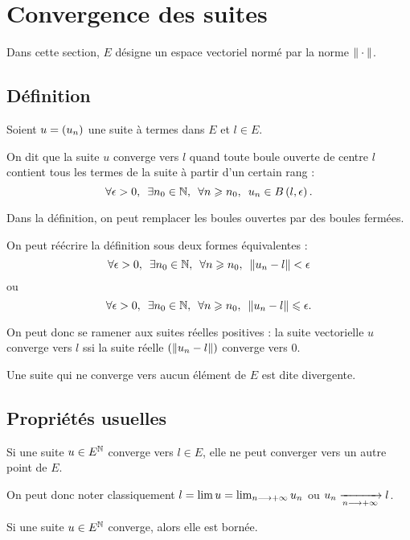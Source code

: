 \section{Convergence des suites}

Dans cette section, \(E\) désigne un espace vectoriel normé par la norme \(\norme{}\).

\subsection{Définition}

\begin{defi}
Soient \(u=\left(u_n\right)\) une suite à termes dans \(E\) et \(l\in E\).

On dit que la suite \(u\) converge vers \(l\) quand toute boule ouverte de centre \(l\) contient tous les termes de la suite à partir d'un certain rang : \[\quantifs{\forall\epsilon>0;\exists n_0\in\N;\forall n\geq n_0}u_n\in\bouleo{l}{\epsilon}.\]
\end{defi}

\begin{prop}
Dans la définition, on peut remplacer les boules ouvertes par des boules fermées.

On peut réécrire la définition sous deux formes équivalentes : \[\quantifs{\forall\epsilon>0;\exists n_0\in\N;\forall n\geq n_0}\norme{u_n-l}<\epsilon\] ou \[\quantifs{\forall\epsilon>0;\exists n_0\in\N;\forall n\geq n_0}\norme{u_n-l}\leq\epsilon.\]

On peut donc se ramener aux suites réelles positives : la suite vectorielle \(u\) converge vers \(l\) ssi la suite réelle \(\paren{\norme{u_n-l}}\) converge vers \(0\).
\end{prop}

Une suite qui ne converge vers aucun élément de \(E\) est dite divergente.

\subsection{Propriétés usuelles}

\begin{prop}
Si une suite \(u\in E^{\mathbb{N}}\) converge vers \(l\in E\), elle ne peut converger vers un autre point de \(E\).

On peut donc noter classiquement \(l=\lim u=\lim_{n\longrightarrow+\infty}u_n\) ou \(u_n\xrightarrow[n\longrightarrow+\infty]{}l\).
\end{prop}

\begin{prop}
Si une suite \(u\in E^{\mathbb{N}}\) converge, alors elle est bornée.
\end{prop}

